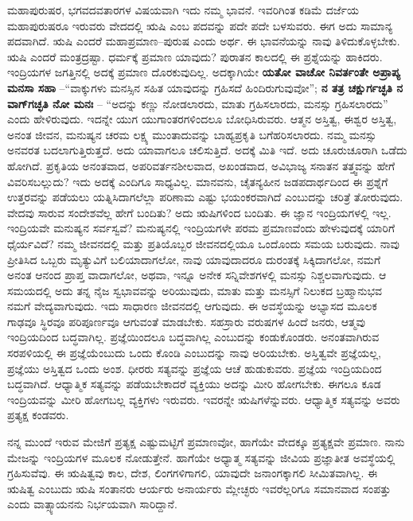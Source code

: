 ಮಹಾಪುರುಷರ, ಭಗವದವತಾರಗಳ ವಿಷಯವಾಗಿ ಇದು ನಮ್ಮ ಭಾವನೆ. ಇವರಿಗಿಂತ ಕಡಿಮೆ ದರ್ಜೆಯ ಮಹಾಪುರುಷರೂ ಇರುವರು ವೇದದಲ್ಲಿ ಋಷಿ ಎಂಬ ಪದವನ್ನು ಪದೇ ಪದೇ ಬಳಸುವರು. ಈಗ ಅದು ಸಾಮಾನ್ಯ ಪದವಾಗಿದೆ. ಋಷಿ ಎಂದರೆ ಮಹಾಪ್ರಮಾಣ–ಪುರುಷ ಎಂದು ಅರ್ಥ. ಈ ಭಾವನೆಯನ್ನು ನಾವು ತಿಳಿದುಕೊಳ್ಳಬೇಕು. ಋಷಿ ಎಂದರೆ ಮಂತ್ರದ್ರಷ್ಟಾ. ಧರ್ಮಕ್ಕೆ ಪ್ರಮಾಣ ಯಾವುದು? ಪುರಾತನ ಕಾಲದಲ್ಲಿ ಈ ಪ್ರಶ್ನೆಯನ್ನು ಹಾಕಿದರು. ಇಂದ್ರಿಯಗಳ ಜಗತ್ತಿನಲ್ಲಿ ಅದಕ್ಕೆ ಪ್ರಮಾಣ ದೊರಕುವುದಿಲ್ಲ. ಅದಕ್ಕಾಗಿಯೇ \textbf{ಯತೋ ವಾಚೋ ನಿವರ್ತಂತೇ ಅಪ್ರಾಪ್ಯ ಮನಸಾ ಸಹಾ }–“ವಾಕ್ಕುಗಳು ಮನಸ್ಸಿನ ಸಹಿತ ಯಾವುದನ್ನು ಗ್ರಹಿಸದೆ ಹಿಂದಿರುಗುವುವೋ”; \textbf{ನ ತತ್ರ ಚಕ್ಷುರ್ಗಚ್ಛತಿ ನ ವಾಗ್​ಗಚ್ಛತಿ ನೋ ಮನಃ }– “ಅದನ್ನು ಕಣ್ಣು ನೋಡಲಾರದು, ಮಾತು ಗ್ರಹಿಸಲಾರದು, ಮನಸ್ಸು ಗ್ರಹಿಸಲಾರದು” ಎಂದು ಹೇಳಿರುವುದು. ಇದನ್ನೇ ಯುಗ ಯುಗಾಂತರಗಳಿಂದಲೂ ಬೋಧಿಸಿರುವರು. ಆತ್ಮನ ಅಸ್ತಿತ್ವ, ಈಶ್ವರ ಅಸ್ತಿತ್ವ, ಅನಂತ ಜೀವನ, ಮನುಷ್ಯನ ಚರಮ ಲಕ್ಷ್ಯ ಮುಂತಾದುವನ್ನು ಬಾಹ್ಯಪ್ರಕೃತಿ ಬಗೆಹರಿಸಲಾರದು. ನಮ್ಮ ಮನಸ್ಸು ಅನವರತ ಬದಲಾಗುತ್ತಿರುತ್ತದೆ. ಅದು ಯಾವಾಗಲೂ ಚಲಿಸುತ್ತಿದೆ. ಅದಕ್ಕೆ ಮಿತಿ ಇದೆ. ಅದು ಚೂರುಚೂರಾಗಿ ಒಡೆದು ಹೋಗಿದೆ. ಪ್ರಕೃತಿಯ ಅನಂತವಾದ, ಅಪರಿವರ್ತನಶೀಲವಾದ, ಅಖಂಡವಾದ, ಅವಿಭಾಜ್ಯ ಸನಾತನ ತತ್ತ್ವವನ್ನು ಹೇಗೆ ವಿವರಿಸಬಲ್ಲುದು? ಇದು ಅದಕ್ಕೆ ಎಂದಿಗೂ ಸಾಧ್ಯವಿಲ್ಲ. ಮಾನವನು, ಚೈತನ್ಯಹೀನ ಜಡಪದಾರ್ಥದಿಂದ ಈ ಪ್ರಶ್ನೆಗೆ ಉತ್ತರವನ್ನು ಪಡೆಯಲು ಯತ್ನಿಸಿದಾಗಲೆಲ್ಲಾ ಪರಿಣಾಮ ಎಷ್ಟು ಭಯಂಕರವಾಗಿದೆ ಎಂಬುದನ್ನು ಚರಿತ್ರೆ ತೋರುವುದು. ವೇದವು ಸಾರುವ ಸಂದೇಶವೆಲ್ಲ ಹೇಗೆ ಬಂದಿತು? ಅದು ಋಷಿಗಳಿಂದ ಬಂದಿತು. ಈ ಜ್ಞಾನ ಇಂದ್ರಿಯಗಳಲ್ಲಿ ಇಲ್ಲ. ಇಂದ್ರಿಯವೇ ಮನುಷ್ಯನ ಸರ್ವಸ್ವವೆ? ಮನುಷ್ಯನಲ್ಲಿ ಇಂದ್ರಿಯಗಳೇ ಪರಮ ಪ್ರಮಾಣವೆಂದು ಹೇಳುವುದಕ್ಕೆ ಯಾರಿಗೆ ಧೈರ್ಯವಿದೆ? ನಮ್ಮ ಜೀವನದಲ್ಲಿ ಮತ್ತು ಪ್ರತಿಯೊಬ್ಬರ ಜೀವನದಲ್ಲಿಯೂ ಒಂದೊಂದು ಸಮಯ ಬರುವುದು. ನಾವು ಪ್ರೀತಿಸಿದ ಒಬ್ಬರು ಮೃತ್ಯುವಿಗೆ ಬಲಿಯಾದಾಗಲೋ, ನಾವು ಯಾವುದಾದರೂ ದುರಂತಕ್ಕೆ ಸಿಕ್ಕಿದಾಗಲೋ, ನಮಗೆ ಅನಂತ ಆನಂದ ಪ್ರಾಪ್ತ ವಾದಾಗಲೋ, ಅಥವಾ, ಇನ್ನೂ ಅನೇಕ ಸನ್ನಿವೇಶಗಳಲ್ಲಿ ಮನಸ್ಸು ನಿಶ್ಚಲವಾಗುವುದು. ಆ ಸಮಯದಲ್ಲಿ ಅದು ತನ್ನ ನೈಜ ಸ್ವಭಾವವನ್ನು ಅರಿಯುವುದು, ಮಾತು ಮತ್ತು ಮನಸ್ಸಿಗೆ ನಿಲುಕದ ಬ್ರಹ್ಮಾನುಭವ ನಮಗೆ ವೇದ್ಯವಾಗುವುದು. ಇದು ಸಾಧಾರಣ ಜೀವನದಲ್ಲಿ ಆಗುವುದು. ಈ ಅವಸ್ಥೆಯನ್ನು ಅಭ್ಯಾಸದ ಮೂಲಕ ಗಾಢವೂ ಸ್ಥಿರವೂ ಪರಿಪೂರ್ಣವೂ ಆಗುವಂತೆ ಮಾಡಬೇಕು. ಸಹಸ್ರಾರು ವರುಷಗಳ ಹಿಂದೆ ಜನರು, ಆತ್ಮವು ಇಂದ್ರಿಯದಿಂದ ಬದ್ಧವಾಗಿಲ್ಲ. ಪ್ರಜ್ಞೆಯಿಂದಲೂ  ಬದ್ಧವಾಗಿಲ್ಲ ಎಂಬುದನ್ನು ಕಂಡುಕೊಂಡರು. ಅನಂತವಾಗಿರುವ ಸರಪಳಿಯಲ್ಲಿ ಈ ಪ್ರಜ್ಞೆಯೆಂಬುದು ಒಂದು ಕೊಂಡಿ ಎಂಬುದನ್ನು ನಾವು ಅರಿಯಬೇಕು. ಅಸ್ತಿತ್ವವೇ ಪ್ರಜ್ಞೆಯಲ್ಲ, ಪ್ರಜ್ಞೆಯು ಅಸ್ತಿತ್ವದ ಒಂದು ಅಂಶ. ಧೀರರು ಸತ್ಯವನ್ನು ಪ್ರಜ್ಞೆಯ ಆಚೆ ಹುಡುಕುವರು. ಪ್ರಜ್ಞೆಯ ಇಂದ್ರಿಯದಿಂದ ಬದ್ಧವಾಗಿದೆ. ಆಧ್ಯಾತ್ಮಿಕ ಸತ್ಯವನ್ನು ಪಡೆಯಬೇಕಾದರೆ ವ್ಯಕ್ತಿಯು ಅದನ್ನು ಮೀರಿ ಹೋಗಬೇಕು. ಈಗಲೂ ಕೂಡ ಇಂದ್ರಿಯವನ್ನು ಮೀರಿ ಹೋಗಬಲ್ಲ ವ್ಯಕ್ತಿಗಳು ಇರುವರು. ಇವರನ್ನೇ ಋಷಿಗಳೆನ್ನುವರು. ಆಧ್ಯಾತ್ಮಿಕ ಸತ್ಯವನ್ನು ಅವರು ಪ್ರತ್ಯಕ್ಷ ಕಂಡವರು. 

ನನ್ನ ಮುಂದೆ ಇರುವ ಮೇಜಿಗೆ ಪ್ರತ್ಯಕ್ಷ ಎಷ್ಟುಮಟ್ಟಿಗೆ ಪ್ರಮಾಣವೋ, ಹಾಗೆಯೇ ವೇದಕ್ಕೂ ಪ್ರತ್ಯಕ್ಷವೇ ಪ್ರಮಾಣ. ನಾನು ಮೇಜನ್ನು ಇಂದ್ರಿಯಗಳ ಮೂಲಕ ನೋಡುತ್ತೇನೆ. ಹಾಗೆಯೇ ಅಧ್ಯಾತ್ಮ ಸತ್ಯವನ್ನು ಜೀವಿಯ ಪ್ರಜ್ಞಾತೀತ ಅವಸ್ಥೆಯಲ್ಲಿ ಗ್ರಹಿಸುವೆವು. ಈ ಋಷಿತ್ವವು ಕಾಲ, ದೇಶ, ಲಿಂಗಗಳಿಗಾಗಲಿ, ಯಾವುದೇ ಜನಾಂಗಕ್ಕಾಗಲಿ ಸೀಮಿತವಾಗಿಲ್ಲ. ಈ ಋಷಿತ್ವ ಎಂಬುದು ಋಷಿ ಸಂತಾನರು ಆರ್ಯರು ಅನಾರ್ಯರು ಮ್ಲೇಚ್ಛರು ಇವರೆಲ್ಲರಿಗೂ ಸಮಾನವಾದ ಸಂಪತ್ತು ಎಂದು ವಾತ್ಸ್ಯಾಯನನು ನಿರ್ಭಯವಾಗಿ ಸಾರಿದ್ದಾನೆ. 

